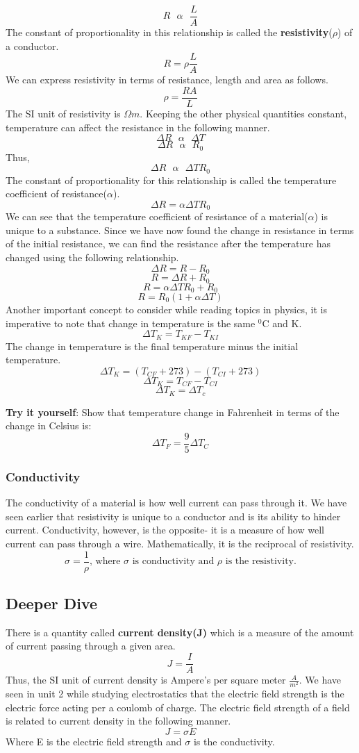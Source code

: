 \documentclass[9pt,addpoints]{exam}
\begin{document}
$$R\text{  }\alpha\text{  }\frac{L}{A}$$   	
The constant of proportionality in this relationship is called the \textbf{resistivity}($\rho$) of a conductor.
$$R=\rho \frac{L}{A}$$
We can express resistivity in terms of resistance, length and area as follows.
$$\rho = \frac{RA}{L}$$
The SI unit of resistivity is $\varOmega m$. \newline \newline
Keeping the other physical quantities constant, temperature can affect the resistance in the following manner. 
$$\varDelta R\text{  }\alpha\text{  }\varDelta T $$
$$\varDelta R\text{  }\alpha\text{  }R_0 $$
Thus,
$$\varDelta R\text{  }\alpha\text{  }\varDelta T R_0$$	
The constant of proportionality for this relationship is called the temperature coefficient of resistance($\alpha$).
$$\varDelta R=\alpha\varDelta T R_0$$
We can see that the temperature coefficient of resistance of a material($\alpha$) is unique to a substance.
Since we have now found the change in resistance in terms of the initial resistance, we can find the resistance after the temperature has changed using the following relationship.
$$\varDelta R=  R- R_0$$
$$R = \varDelta R + R_0$$
$$R =\alpha\varDelta T R_0  + R_0$$
$$R =R_0(1+\alpha\varDelta T)$$
Another important concept to consider while reading topics in physics, it is imperative to note that change in temperature is the same $^0\text{C}$ and K.
$$\varDelta T_K = T_{KF} - T_{KI}$$
The change in temperature is the final temperature minus the initial temperature.
$$\varDelta T_K = (T_{CF} + 273) - (T_{CI}+273)$$
$$\varDelta T_K = T_{CF}  - T_{CI}$$
$$\varDelta T_K = \varDelta T_c$$

\textbf{Try it yourself}: Show that temperature change in Fahrenheit in terms of the change in Celsius is:
$$\varDelta T_F = \frac{9}{5}\varDelta T_C$$
\subsubsection*{Conductivity}
The conductivity of a material is how well current can pass through it. We have seen earlier that resistivity is unique to a conductor and is its ability to hinder current. Conductivity, however, is the opposite- it is a measure of how well current can pass through a wire. Mathematically, it is the reciprocal of resistivity.
$$\sigma=\frac{1}{\rho}\text{, where }\sigma\text{ is conductivity and }\rho\text{ is the resistivity.}$$

\subsection*{Deeper Dive}
There is a quantity called \textbf{current density(J)} which is a measure of the amount of current passing through a given area.
$$J = \frac{I}{A}$$
Thus, the SI unit of current density is Ampere's per square meter  $\frac{A}{m^2}$.
We have seen in unit 2 while studying electrostatics that the electric field strength is the electric force acting per a coulomb of charge. The electric field strength of a field is related to current density in the following manner.
$$J = \sigma E $$
Where E is the electric field strength and $\sigma$ is the conductivity.
\end{document}
